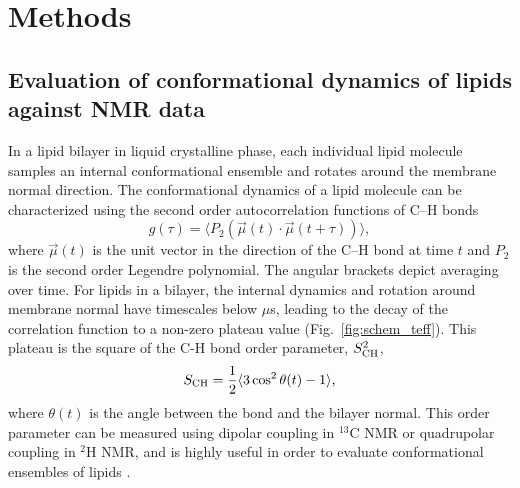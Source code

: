 \documentclass[journal=jpcbfk,manuscript=article,layout=twocolumn]{achemso}
\begin{document}



\section{Methods}
\subsection{Evaluation of conformational dynamics of lipids against NMR data}\label{sec:theory}
In a lipid bilayer in liquid crystalline phase, each individual lipid molecule samples an internal conformational
ensemble and rotates around
the membrane normal direction.
The conformational dynamics of a lipid molecule can be characterized using
the second order autocorrelation functions of C--H bonds %
\begin{equation}
\label{eq:BCF}
g(\tau)=\langle P_{2}\left(\vec{\mu}(t)\cdot \vec{\mu}(t+\tau)\right)\rangle ,
\end{equation}
where $\vec{\mu}(t)$ is the unit vector in the direction of the C--H bond at time $t$ and $P_{2}$ is the second order Legendre polynomial.
The angular brackets depict averaging over time.
For lipids in a bilayer, the internal dynamics and rotation around membrane normal
have timescales below $\mu$s, leading to the decay of the correlation function to a non-zero plateau value (Fig.~\ref{fig:schem_teff}).
This plateau is the square of the C-H bond order parameter, $S^{2}_{\rm{CH}}$, 
\begin{equation}
\label{eq:OP}
S_{\rm{CH}}=\frac{1}{2}\langle 3\cos^{2}\theta(t)-1\rangle ,
\end{equation}
where $\theta(t)$ is the angle between the bond and the bilayer normal.
This order parameter can be measured using dipolar coupling in $^{13}$C NMR or quadrupolar coupling in $^{2}$H NMR,
and is highly useful in order to evaluate conformational ensembles of lipids \cite{ollila16}.
\end{document}
